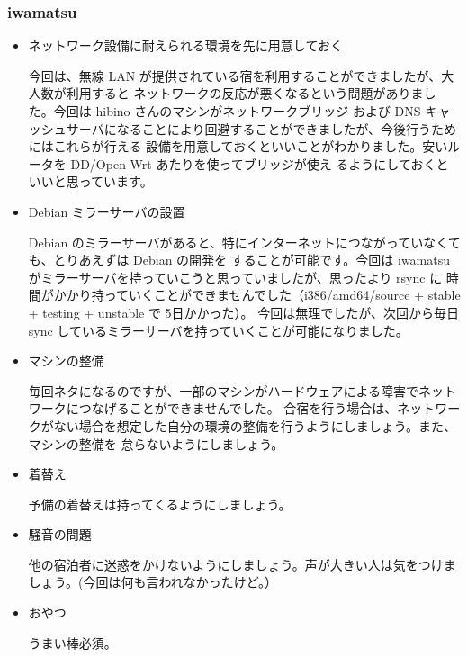 \documentclass[mingoth,a4paper]{jsarticle}
\begin{document}
\subsubsection{iwamatsu}
\begin{itemize}
\item ネットワーク設備に耐えられる環境を先に用意しておく
 
今回は、無線 LAN が提供されている宿を利用することができましたが、大人数が利用すると
ネットワークの反応が悪くなるという問題がありました。今回は hibino さんのマシンがネットワークブリッジ
および DNS キャッシュサーバになることにより回避することができましたが、今後行うためにはこれらが行える
設備を用意しておくといいことがわかりました。安いルータを DD/Open-Wrt あたりを使ってブリッジが使え
るようにしておくといいと思っています。

\item Debian ミラーサーバの設置

Debian のミラーサーバがあると、特にインターネットにつながっていなくても、とりあえずは Debian の開発を
することが可能です。今回は iwamatsu がミラーサーバを持っていこうと思っていましたが、思ったより rsync に
時間がかかり持っていくことができませんでした（i386/amd64/source + stable + testing + unstable で 5日かかった）。
今回は無理でしたが、次回から毎日 sync しているミラーサーバを持っていくことが可能になりました。

\item マシンの整備

毎回ネタになるのですが、一部のマシンがハードウェアによる障害でネットワークにつなげることができませんでした。
合宿を行う場合は、ネットワークがない場合を想定した自分の環境の整備を行うようにしましょう。また、マシンの整備を
怠らないようにしましょう。

\item 着替え

予備の着替えは持ってくるようにしましょう。

\item 騒音の問題

他の宿泊者に迷惑をかけないようにしましょう。声が大きい人は気をつけましょう。(今回は何も言われなかったけど。）

\item おやつ

うまい棒必須。

\end{itemize}
\end{document}
